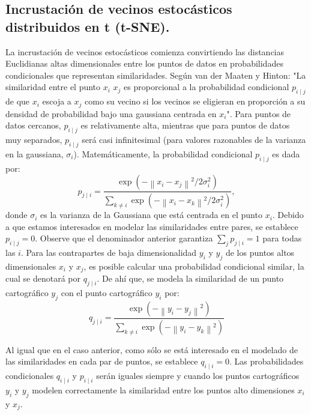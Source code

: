 \documentclass[12pt,letterpaper,oneside,openright]{book}
\begin{document}
\subsection{Incrustación de vecinos estocásticos distribuidos en t (t-SNE).}
	 La incrustación de vecinos estocásticos comienza convirtiendo las distancias Euclidianas altas dimensionales entre los puntos de datos en probabilidades condicionales que representan similaridades. Según van der Maaten y Hinton: "La similaridad entre el punto $x_i$ $x_j$ es proporcional a la probabilidad condicional $p_{i\mid j}$ de que $x_i$ escoja a $x_j$ como su vecino si los vecinos se eligieran en proporción a su densidad de probabilidad bajo una gaussiana centrada en $x_i$". Para puntos de datos cercanos, $p_{i\mid j}$ es relativamente alta, mientras que para puntos de datos muy separados, $p_{i\mid j}$ será casi infinitesimal (para valores razonables de la varianza en la gaussiana, $\sigma_i$). Matemáticamente, la probabilidad condicional $p_{i\mid j}$ es dada por: 
	 \begin{equation}
	 	\label{eq:prob_cond}
	 	p_{j \mid i}=\frac{\exp \left(-\left\|x_i-x_j\right\|^2 / 2 \sigma_i^2\right)}{\sum_{k \neq i} \exp \left(-\left\|x_i-x_k\right\|^2 / 2 \sigma_i^2\right)},
	 \end{equation}
	donde $\sigma_i$ es la varianza de la Gaussiana que está centrada en el punto $x_i$. Debido a que estamos interesados en modelar las similaridades entre pares, se establece $p_{i\mid j} = 0$. Observe que el denominador anterior garantiza $\sum_j p_{j \mid i}=1$ para todas las $i$. Para las contrapartes de baja dimensionalidad $y_i$ y $y_j$ de los puntos altos dimensionales $x_i$ y $x_j$, es posible calcular una probabilidad condicional similar, la cual se denotará por $q_{j \mid i}$. De ahí que, se modela la similaridad de un punto cartográfico $y_j$ con el punto cartográfico $y_i$ por:
	\begin{equation}
		\label{eq:prob_cond_q}
		q_{j \mid i}=\frac{\exp \left(-\left\|y_i-y_j\right\|^2\right)}{\sum_{k \neq i} \exp \left(-\left\|y_i-y_k\right\|^2\right)}
	\end{equation}
	
	Al igual que en el caso anterior, como sólo se está interesado en el modelado de las similaridades en cada par de puntos, se establece $q_{i \mid i}=0$.
	Las probabilidades condicionales $q_{i \mid i}$ y $p_{i \mid i}$ serán iguales siempre y cuando los puntos cartográficos $y_i$ y $y_j$ modelen correctamente la similaridad entre los puntos alto dimensiones $x_i$ y $x_j$.
	
\end{document}
